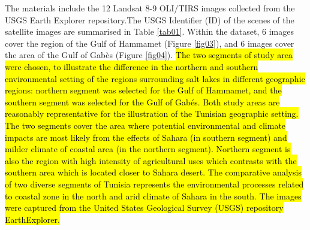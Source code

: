 \documentclass[land,article,submit,pdftex,moreauthors]{Definitions/mdpi}
\begin{document}
The materials include the 12 Landsat 8-9 OLI/TIRS images collected from the USGS Earth Explorer repository.The USGS Identifier (ID) of the scenes of the satellite images are summarised in Table \ref{tab01}. Within the dataset, 6 images cover the region of the Gulf of Hammamet (Figure \ref{fig03}), and 6 images cover the area of the Gulf of Gabès (Figure \ref{fig04}). \hl{The two segments of study area were chosen, to illustrate the difference in the northern and southern environmental setting of the regions surrounding salt lakes in different geographic regions: northern segment was selected for the Gulf of Hammamet, and the southern segment was selected for the Gulf of Gab\'es. Both study areas are reasonably representative for the illustration of the Tunisian geographic setting. The two segments cover the area where potential environmental and climate impacts are most likely from the effects of Sahara (in southern segment) and milder climate of coastal area (in the northern segment). Northern segment is also the region with high intensity of agricultural uses which contrasts with the southern area which is located closer to Sahara desert. The comparative analysis of two diverse segments of Tunisia represents the environmental processes related to coastal zone in the north and arid climate of Sahara in the south. The images were captured from the United States Geological Survey (USGS) repository EarthExplorer.}
\end{document}
